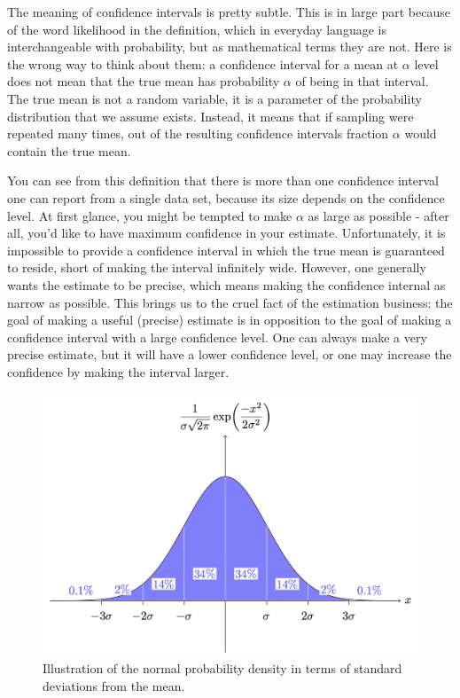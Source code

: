 \documentclass[
  letterpaper,
  DIV=11,
  numbers=noendperiod]{scrreprt}
\begin{document}
The meaning of confidence intervals is pretty subtle. This is in large
part because of the word likelihood in the definition, which in everyday
language is interchangeable with probability, but as mathematical terms
they are not. Here is the wrong way to think about them: a confidence
interval for a mean at \(\alpha\) level does not mean that the true mean
has probability \(\alpha\) of being in that interval. The true mean is
not a random variable, it is a parameter of the probability distribution
that we assume exists. Instead, it means that if sampling were repeated
many times, out of the resulting confidence intervals fraction
\(\alpha\) would contain the true mean.

You can see from this definition that there is more than one confidence
interval one can report from a single data set, because its size depends
on the confidence level. At first glance, you might be tempted to make
\(\alpha\) as large as possible - after all, you'd like to have maximum
confidence in your estimate. Unfortunately, it is impossible to provide
a confidence interval in which the true mean is guaranteed to reside,
short of making the interval infinitely wide. However, one generally
wants the estimate to be precise, which means making the confidence
internal as narrow as possible. This brings us to the cruel fact of the
estimation business: the goal of making a useful (precise) estimate is
in opposition to the goal of making a confidence interval with a large
confidence level. One can always make a very precise estimate, but it
will have a lower confidence level, or one may increase the confidence
by making the interval larger.

\begin{figure}

{\centering \includegraphics{./ch5/standard-deviation-tikz.png}

}

\caption{Illustration of the normal probability density in terms of
standard deviations from the mean.}

\end{figure}
\end{document}
